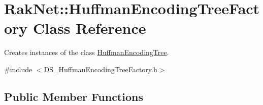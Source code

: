 \hypertarget{class_rak_net_1_1_huffman_encoding_tree_factory}{\section{Rak\-Net\-:\-:Huffman\-Encoding\-Tree\-Factory Class Reference}
\label{class_rak_net_1_1_huffman_encoding_tree_factory}
}


Creates instances of the class \hyperlink{class_rak_net_1_1_huffman_encoding_tree}{Huffman\-Encoding\-Tree}.  




{\ttfamily \#include $<$D\-S\-\_\-\-Huffman\-Encoding\-Tree\-Factory.\-h$>$}

\subsection*{Public Member Functions}
